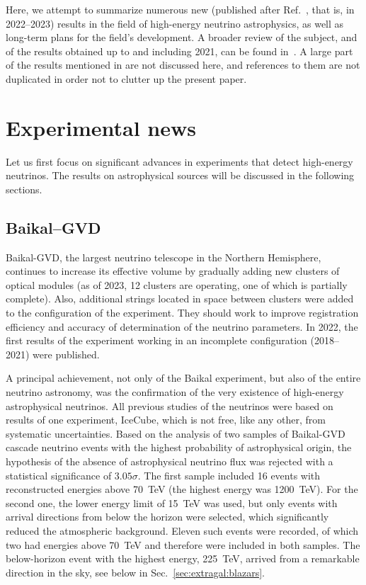 \documentclass[a4paper,noshowpacs,noshowkeys,floatfix,twocolumn,preprintnumbers,nofootinbib]{revtex4-2}
\begin{document}
Here, we attempt to summarize numerous new (published after Ref.~\cite{ST-UFN}, that is, in 2022--2023) results in the field of high-energy neutrino astrophysics, as well as long-term plans for the field's development. A broader review of the subject, and of the results obtained up to and including 2021, can be found in~\cite{ST-UFN}. A large part of the results mentioned in \cite{ST-UFN} are not discussed here, and references to them are not duplicated in order not to clutter up the present paper.

\section{Experimental news}
\label{sec:exp}
Let us first focus on significant advances in experiments that detect high-energy neutrinos. The results on astrophysical sources will be discussed in the following sections.
\subsection{Baikal--GVD}
\label{sec:exp:GVD}
Baikal-GVD, the largest neutrino telescope in the Northern Hemisphere, continues to increase its effective volume by gradually adding new clusters of optical modules (as of 2023, 12 clusters are operating, one of which is partially complete). Also, additional strings located in space
between clusters were added to the configuration of the experiment. They should work to improve registration efficiency and accuracy of determination of the neutrino parameters. In 2022, the first results of the experiment working in an incomplete configuration (2018--2021) were published.

A principal achievement, not only of the Baikal experiment, but also of the entire neutrino astronomy, was the confirmation of the very existence of high-energy astrophysical neutrinos. All previous studies of the neutrinos were based on results of one experiment, IceCube, which is not free, like any other, from systematic uncertainties. Based on the analysis of two samples of Baikal-GVD cascade neutrino events with the highest probability of astrophysical origin, the hypothesis of the absence of astrophysical neutrino flux was rejected \cite{Baikal-diffusePRD} with a statistical significance of $3.05\sigma$. The first sample included 16 events with reconstructed energies above 70~TeV (the highest energy was 1200~TeV). For the second one, the lower energy limit of 15~TeV was used, but only events with arrival directions from below the horizon were selected, which significantly reduced the atmospheric background. Eleven such events were recorded, of which two had energies above 70~TeV and therefore were included in both samples. The below-horizon event with the highest energy, 225~TeV, arrived from a remarkable direction in the sky, see below in Sec.~\ref{sec:extragal:blazars}.
\end{document}
